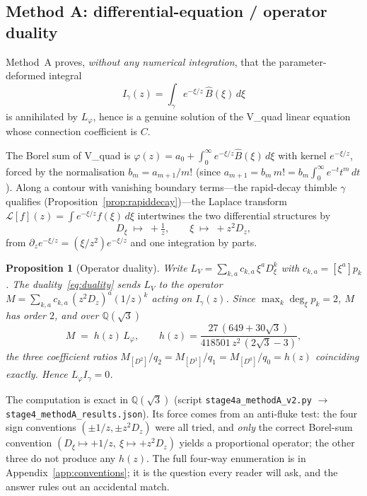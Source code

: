 \documentclass[11pt,reqno]{amsart}
\theoremstyle{plain}
\newtheorem{proposition}[theorem]{Proposition}
\theoremstyle{definition}
\newcommand{\Bhat}{\widehat{B}}
\newcommand{\Lphi}{L_{\varphi}}
\newcommand{\LV}{L_{V}}
\newcommand{\Qsqrt}{\mathbb{Q}(\sqrt3)}
\providecommand{\C}{}\renewcommand{\C}{C}
\begin{document}
\subsection{Method A: differential-equation / operator duality}\label{sub:methodA}
Method~A proves, \emph{without any numerical integration}, that the parameter-deformed integral
\begin{equation}\label{eq:Igamma}
  I_\gamma(z)=\int_\gamma e^{-\xi/z}\,\Bhat(\xi)\,d\xi
\end{equation}
is annihilated by $\Lphi$, hence is a genuine solution of the V\_quad linear equation whose
connection coefficient is $\C$.

The Borel sum of V\_quad is $\varphi(z)=a_0+\int_0^\infty e^{-\xi/z}\Bhat(\xi)\,d\xi$ with kernel
$e^{-\xi/z}$, forced by the normalisation $b_m=a_{m+1}/m!$ (since
$a_{m+1}=b_m\,m!=b_m\int_0^\infty e^{-t}t^m\,dt$). Along a contour with vanishing boundary
terms---the rapid-decay thimble $\gamma$ qualifies (Proposition~\ref{prop:rapiddecay})---the
Laplace transform $\mathcal{L}[f](z)=\int e^{-\xi/z}f(\xi)\,d\xi$ intertwines the two differential
structures by
\begin{equation}\label{eq:duality}
  D_\xi\;\longmapsto\;+\tfrac1z,\qquad \xi\;\longmapsto\;+z^2 D_z,
\end{equation}
from $\partial_z e^{-\xi/z}=(\xi/z^2)e^{-\xi/z}$ and one integration by parts.

\begin{proposition}[Operator duality]\label{prop:methodA}
Write $\LV=\sum_{k,a}c_{k,a}\,\xi^a D_\xi^k$ with $c_{k,a}=[\xi^a]p_k$. The
duality~\eqref{eq:duality} sends $\LV$ to the operator
$M=\sum_{k,a}c_{k,a}\,(z^2D_z)^a(1/z)^k$ acting on $I_\gamma(z)$. Since $\max_k\deg_\xi p_k=2$,
$M$ has order $2$, and over $\Qsqrt$
\begin{equation}\label{eq:M-equals-hLphi}
  M\;=\;h(z)\,\Lphi,\qquad h(z)=\frac{27\,(649+30\sqrt3)}{418501\,z^2\,(2\sqrt3-3)} ,
\end{equation}
the three coefficient ratios $M_{[D^2]}/q_2=M_{[D^1]}/q_1=M_{[D^0]}/q_0=h(z)$ coinciding exactly.
Hence $\Lphi I_\gamma=0$.
\end{proposition}

The computation is exact in $\Qsqrt$ (script \texttt{stage4a\_methodA\_v2.py}
$\to$ \texttt{stage4\_methodA\_results.json}). Its force comes from an anti-fluke test: the four
sign conventions $(\pm1/z,\pm z^2D_z)$ were all tried, and \emph{only} the correct Borel-sum
convention $(D_\xi\mapsto+1/z,\ \xi\mapsto+z^2D_z)$ yields a proportional operator; the other three
do not produce any $h(z)$. The full four-way enumeration is in Appendix~\ref{app:conventions};
it is the question every reader will ask, and the answer rules out an accidental match.
\end{document}
